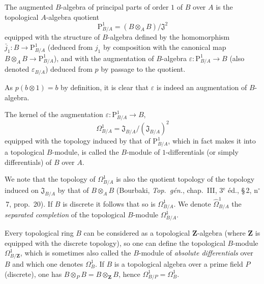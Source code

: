 \begin{definition}[20.4.2]
\label{0.20.4.2}
The augmented $B$-algebra of principal parts of order $1$ of $B$ over $A$ is the topological $A$-algebra quotient
\begin{equation}
\tag{20.4.2.1}
  \label{0.20.4.2.1}
  \mathrm{P}^1_{B/A} = (B\otimes_A B)/\mathfrak{J}^2
\end{equation}
equipped with the structure of $B$-algebra defined by the homomorphism $\bar{j}_1:B\to\mathrm{P}^1_{B/A}$ (deduced from $j_1$ by composition with the canonical map $B\otimes_A B\to\mathrm{P}^1_{B/A}$), and with the augmentation of $B$-algebra $\varepsilon:\mathrm{P}^1_{B/A}\to B$ (also denoted $\varepsilon_{B/A}$) deduced from $p$ by passage to the quotient.
\end{definition}

As $p(b\otimes 1)=b$ by definition, it is clear that $\varepsilon$ is indeed an augmentation of $B$-algebra.

\begin{definition}[20.4.3]
\label{0.20.4.3}
The kernel of the augmentation $\varepsilon:\mathrm{P}^1_{B/A}\to B$,
\begin{equation}
\tag{20.4.3.1}
  \label{0.20.4.3.1}
  \Omega^1_{B/A} = \mathfrak{J}_{B/A}/(\mathfrak{J}_{B/A})^2
\end{equation}
equipped with the topology induced by that of $\mathrm{P}^1_{B/A}$, which in fact makes it into a topological $B$-module, is called the $B$-module of $1$-differentials \textup{(or simply} differentials) of $B$ over $A$.
\end{definition}

We note that the topology of $\Omega^1_{B/A}$ is also the quotient topology of the topology induced on $\mathfrak{J}_{B/A}$ by that of $B\otimes_A B$ (Bourbaki, \emph{Top.\ g\'{e}n.}, chap.~III, 3$^\text{e}$ \'{e}d., \S\,2, n$^\circ$\,7, prop.~20).
If $B$ is discrete it follows that so is $\Omega^1_{B/A}$.
We denote $\widehat{\Omega}^1_{B/A}$ the \emph{separated completion} of the topological $B$-module $\Omega^1_{B/A}$.

Every topological ring $B$ can be considered as a topological $\mathbf{Z}$-algebra (where $\mathbf{Z}$ is equipped with the discrete topology), so one can define the topological $B$-module $\Omega^1_{B/\mathbf{Z}}$, which is sometimes also called the $B$-module of \emph{absolute differentials} over $B$ and which one denotes $\Omega^1_B$.
If $B$ is a topological algebra over a prime field $P$ (discrete), one has $B\otimes_P B=B\otimes_{\mathbf{Z}}B$, hence $\Omega^1_{B/P}=\Omega^1_B$.

